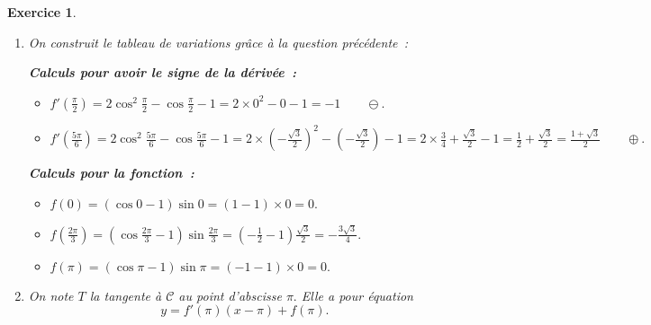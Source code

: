 \documentclass[10pt]{article}
\newtheorem{exo}{Exercice}
\begin{document}
\begin{exo}
\begin{enumerate}
Revenons à l'équation $(\ref{A})~:$ d'après ce qui précède, il y a deux possibilités~:
\[\cos x=-\frac{1}{2}~\text{ou}~\cos x=1.\]
On résout comme d'habitude et on obtient deux solutions~: $x=\frac{2\pi}{3}$ et $x=0.$

\newpage
\item On construit le tableau de variations grâce à la question précédente~:

\medskip

\begin{multicols}{2}
\begin{center}
\end{center}

\textbf{Calculs pour avoir le signe de la dérivée~:}

\begin{itemize}
\item[\textbullet] $f'\left(\frac{\pi}{2}\right)=2\cos^2 \frac{\pi}{2}-\cos \frac{\pi}{2}-1=2\times 0^2-0-1=-1\qquad\ominus.$
\item[\textbullet] $f'\left(\frac{5\pi}{6}\right)=2\cos^2 \frac{5\pi}{6}-\cos \frac{5\pi}{6}-1=2\times \left(-\frac{\sqrt{3}}{2}\right)^2-\left(-\frac{\sqrt{3}}{2}\right)-1=2\times \frac{3}{4}+\frac{\sqrt{3}}{2}-1=\frac{1}{2}+\frac{\sqrt{3}}{2}=\frac{1+\sqrt{3}}{2}\qquad\oplus.$

\end{itemize}

\medskip

\textbf{Calculs pour la fonction~:}

\begin{itemize}
\item[\textbullet] $f(0)=(\cos 0-1)\sin 0=(1-1)\times 0=0.$
\item[\textbullet] $f\left(\frac{2\pi}{3}\right)=\left(\cos \frac{2\pi}{3}-1\right)\sin \frac{2\pi}{3}=\left(- \frac{1}{2}-1\right)\frac{\sqrt{3}}{2}=-\frac{3\sqrt{3}}{4}.$
\item[\textbullet] $f(\pi)=(\cos \pi-1)\sin \pi=(-1-1)\times 0=0.$
\end{itemize}
\end{multicols}
\item On note $T$ la tangente à $\mathcal{C}$ au point d'abscisse $\pi.$ Elle a pour équation 
\[y=f'(\pi)(x-\pi)+f(\pi).\]


\end{enumerate}
\end{exo}
\end{document}
